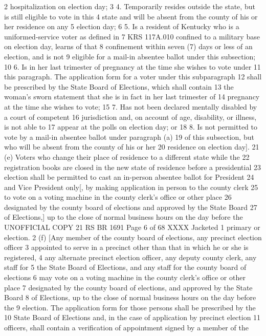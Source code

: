 2 hospitalization on election day;
3 4. Temporarily resides outside the state, but is still eligible to vote in this
4 state and will be absent from the county of his or her residence on any
5 election day;
6 5. Is a resident of Kentucky who is a uniformed-service voter as defined in
7 KRS 117A.010 confined to a military base on election day, learns of that
8 confinement within seven (7) days or less of an election, and is not
9 eligible for a mail-in absentee ballot under this subsection;
10 6. Is in her last trimester of pregnancy at the time she wishes to vote under
11 this paragraph. The application form for a voter under this subparagraph
12 shall be prescribed by the State Board of Elections, which shall contain
13 the woman's sworn statement that she is in fact in her last trimester of
14 pregnancy at the time she wishes to vote;
15 7. Has not been declared mentally disabled by a court of competent
16 jurisdiction and, on account of age, disability, or illness, is not able to
17 appear at the polls on election day; or
18 8. Is not permitted to vote by a mail-in absentee ballot under paragraph (a)
19 of this subsection, but who will be absent from the county of his or her
20 residence on election day].
21 (e) Voters who change their place of residence to a different state while the
22 registration books are closed in the new state of residence before a presidential
23 election shall be permitted to cast an in-person absentee ballot for President
24 and Vice President only[, by making application in person to the county clerk
25 to vote on a voting machine in the county clerk's office or other place
26 designated by the county board of elections and approved by the State Board
27 of Elections,] up to the close of normal business hours on the day before the 
UNOFFICIAL COPY 21 RS BR 1691
Page 6 of 68
XXXX Jacketed
1 primary or election.
2 (f) [Any member of the county board of elections, any precinct election officer
3 appointed to serve in a precinct other than that in which he or she is registered,
4 any alternate precinct election officer, any deputy county clerk, any staff for
5 the State Board of Elections, and any staff for the county board of elections
6 may vote on a voting machine in the county clerk's office or other place
7 designated by the county board of elections, and approved by the State Board
8 of Elections, up to the close of normal business hours on the day before the
9 election. The application form for those persons shall be prescribed by the
10 State Board of Elections and, in the case of application by precinct election
11 officers, shall contain a verification of appointment signed by a member of the
